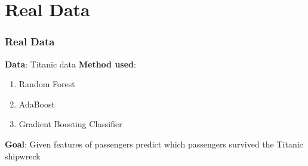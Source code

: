 \section{Real Data}

\begin{frame}[fragile] %
    \frametitle{Real Data}
    \textbf{Data}: Titanic data
    \newline \textbf{Method used}: 
    \begin{enumerate}
        \item Random Forest
        \item AdaBoost
        \item Gradient Boosting Classifier
    \end{enumerate}
    \textbf{Goal}: Given features of passengers predict which passengers survived the Titanic shipwreck
\end{frame}
    

